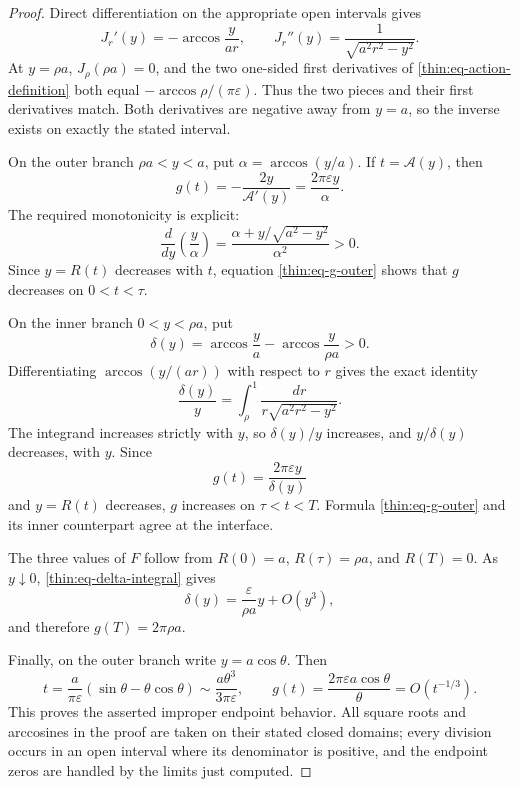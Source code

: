 \documentclass[11pt]{article}
\numberwithin{equation}{section}
\theoremstyle{definition}
\theoremstyle{remark}
\begin{document}
\begin{proof}
Direct differentiation on the appropriate open intervals gives
\begin{equation}
  J_r'(y)=-\arccos\frac{y}{ar},
  \qquad
  J_r''(y)=\frac1{\sqrt{a^2r^2-y^2}}.
  \label{thin:eq-J-derivatives}
\end{equation}
At \(y=\rho a\), \(J_\rho(\rho a)=0\), and the two one-sided first
derivatives of \eqref{thin:eq-action-definition} both equal
\(-\arccos\rho/(\pi\varepsilon)\).  Thus the two pieces and their first
derivatives match.  Both derivatives are negative away from \(y=a\), so the
inverse exists on exactly the stated interval.

On the outer branch \(\rho a<y<a\), put
\(\alpha=\arccos(y/a)\).  If \(t=\mathcal A(y)\), then
\begin{equation}
  g(t)=-\frac{2y}{\mathcal A'(y)}
      =\frac{2\pi\varepsilon y}{\alpha}.
  \label{thin:eq-g-outer}
\end{equation}
The required monotonicity is explicit:
\[
 \frac{d}{dy}\left(\frac{y}{\alpha}\right)
 =\frac{\alpha+y/\sqrt{a^2-y^2}}{\alpha^2}>0.
\]
Since \(y=R(t)\) decreases with \(t\), equation
\eqref{thin:eq-g-outer} shows that \(g\) decreases on \(0<t<\tau\).

On the inner branch \(0<y<\rho a\), put
\[
  \delta(y)=\arccos\frac ya-\arccos\frac{y}{\rho a}>0.
\]
Differentiating \(\arccos(y/(ar))\) with respect to \(r\) gives the exact
identity
\begin{equation}
  \frac{\delta(y)}{y}
  =\int_\rho^1\frac{dr}{r\sqrt{a^2r^2-y^2}}.
  \label{thin:eq-delta-integral}
\end{equation}
The integrand increases strictly with \(y\), so \(\delta(y)/y\) increases,
and \(y/\delta(y)\) decreases, with \(y\).  Since
\[
  g(t)=\frac{2\pi\varepsilon y}{\delta(y)}
\]
and \(y=R(t)\) decreases, \(g\) increases on \(\tau<t<T\).  Formula
\eqref{thin:eq-g-outer} and its inner counterpart agree at the interface.

The three values of \(F\) follow from
\(R(0)=a\), \(R(\tau)=\rho a\), and \(R(T)=0\).  As \(y\downarrow0\),
\eqref{thin:eq-delta-integral} gives
\[
  \delta(y)=\frac{\varepsilon}{\rho a}y+O(y^3),
\]
and therefore \(g(T)=2\pi\rho a\).

Finally, on the outer branch write \(y=a\cos\theta\).  Then
\begin{equation}
  t=\frac{a}{\pi\varepsilon}
       (\sin\theta-\theta\cos\theta)
    \sim\frac{a\theta^3}{3\pi\varepsilon},
  \qquad
  g(t)=\frac{2\pi\varepsilon a\cos\theta}{\theta}
       =O(t^{-1/3}).
  \label{thin:eq-improper-asymptotic}
\end{equation}
This proves the asserted improper endpoint behavior.  All square roots and
arccosines in the proof are taken on their stated closed domains; every
division occurs in an open interval where its denominator is positive, and
the endpoint zeros are handled by the limits just computed.
\end{proof}
\end{document}
